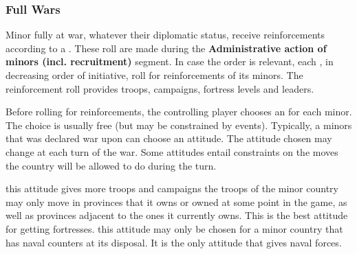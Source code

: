 \subsubsection{Full Wars}
\aparag[Generalities]
\bparag Minor fully at war, whatever their diplomatic status, receive
reinforcements according to a .
\bparag These roll are made during the \textbf{Administrative action of minors
  (incl. recruitment)} segment.
\bparag In case the order is relevant, each \MAJ, in decreasing order of
initiative, roll for reinforcements of its minors.
\bparag The reinforcement roll provides troops, campaigns, fortress levels and
leaders.

\aparag[Attitude]
\bparag Before rolling for reinforcements, the controlling player chooses an
 for each minor.
\bparag The choice is usually free (but may be constrained by
events). Typically, a minors that was declared war upon can choose an
 attitude.
\bparag The attitude chosen may change at each turn of the war.
\bparag Some attitudes entail constraints on the moves the country will be
allowed to do during the turn.

\bparag[Offensive:] this attitude gives more troops and campaigns
%
\bparag[Defensive:] the troops of the minor country may only move in provinces
that it owns or owned at some point in the game, as well as provinces adjacent
to the ones it currently owns. This is the best attitude for getting
fortresses.
\bparag[Naval:] this attitude may only be chosen for a minor country that has
naval counters at its disposal. It is the only attitude that gives naval
forces.
%


